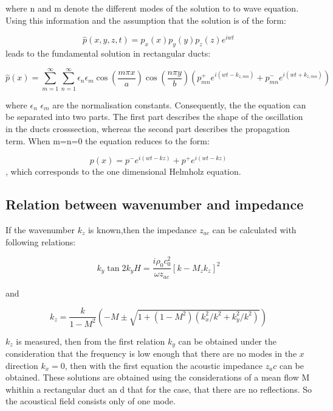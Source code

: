 \documentclass[11pt]{report} %
\begin{document}
where n and m denote the different modes of the solution to to wave equation. 
Using this information and the assumption that the solution is of the form: 

\begin{equation}
\hat{p}(x,y,z,t)=p_{x}(x)p_{y}(y)p_{z}(z)e^{iwt}
\end{equation}
leads to the fundamental solution in rectangular ducts: 

\begin{equation} \label{eqn:ductmodes}
\hat{p}(x)=\sum\limits_{m=1}^\infty\sum\limits_{n=1}^\infty \epsilon_{n}\epsilon_{m}\cos(\frac{m\pi x}{a})\cos(\frac{n\pi y}{b})\left( p_{mn}^{+} e^{i(wt-k_{z,mn})}+p_{mn}^{-}e^{i(wt+k_{z,mn})} \right)
\end{equation}

where $\epsilon_{n}$ $\epsilon_{m}$ are the normalisation constants. 
Consequently, the the equation can be separated into two parts. 
The first part describes the shape of the oscillation in the ducts crosssection, whereas the second part describes the propagation term. 
When m=n=0 the equation reduces to the form:

\begin{equation}
p(x)=p^{-}e^{i(wt-kz)}+p^{+}e^{i(wt-kz)} 
\end{equation}, which corresponds to the one dimensional Helmholz equation. 
  

\subsection{Relation between wavenumber and impedance}
If the wavenumber $k_z$ is known,then the impedance $z_{ac}$ can be calculated with following relations:
  
\begin{equation}\label{eqn: Impdet1}
    k_y \tan 2k_y H = \frac{i \rho_0 c_0^2}{\omega z_{ac}} \left[k-M_zk_z\right]^2
\end{equation}

and

\begin{equation}\label{eqn: Impdet2}
    k_z = \frac{k}{1-M^2} \left( -M \pm \sqrt{1+(1-M^2)(k_x^2/k^2 + k_y^2/k^2)}\right)    
\end{equation}

$k_z$ is measured, then from the first relation $k_y$ can be obtained under the consideration that the frequency is low enough that there are no modes in the $x$ direction $k_x = 0$, then with the first equation the acoustic impedance $z_ac$ can be obtained.
These solutions are obtained using the considerations of a mean flow M whithin a rectangular duct an d that for the case, that there are no reflections. So the acoustical field consists only of one mode. 
\end{document}
